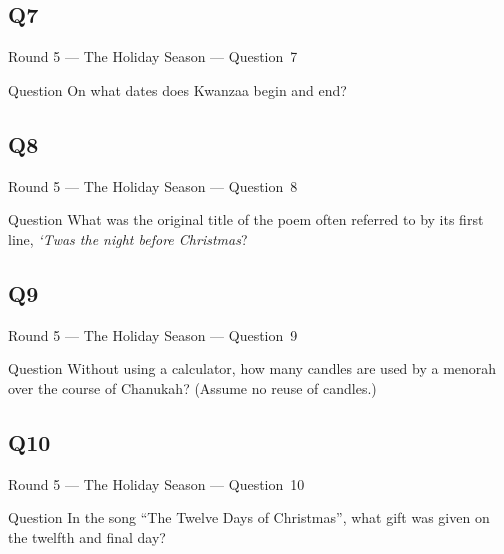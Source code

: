\documentclass[11pt]{beamer}
\begin{document}
\subsection*{Q7}
\begin{frame}[t]{Round 5 --- The Holiday Season --- \mbox{Question 7}}
\vspace{-0.5em}
\begin{block}{Question}
On what dates does Kwanzaa begin and end?
\end{block}
\end{frame}
\subsection*{Q8}
\begin{frame}[t]{Round 5 --- The Holiday Season --- \mbox{Question 8}}
\vspace{-0.5em}
\begin{block}{Question}
What was the original title of the poem often referred to by its first line, \emph{`Twas the night before Christmas}? 
\end{block}
\end{frame}
\subsection*{Q9}
\begin{frame}[t]{Round 5 --- The Holiday Season --- \mbox{Question 9}}
\vspace{-0.5em}
\begin{block}{Question}
Without using a calculator, how many candles are used by a menorah over the course of Chanukah? (Assume no reuse of candles.)
\end{block}
\end{frame}
\subsection*{Q10}
\begin{frame}[t]{Round 5 --- The Holiday Season --- \mbox{Question 10}}
\vspace{-0.5em}
\begin{block}{Question}
In the song ``The Twelve Days of Christmas'', what gift was given on the twelfth and final day?
\end{block}
\end{frame}
\end{document}
